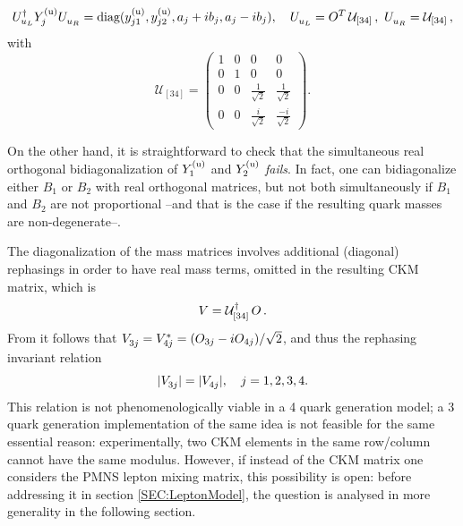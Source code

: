 \documentclass[12pt,a4paper]{article}
\begin{document}
\begin{equation}\label{eq:block2x2:YUdiag:0}
 \ULUd\YU{j}\URU=\text{diag}(\yU{j1},\yU{j2},a_j+ib_j,a_j-ib_j),\quad 
 \ULU=O^T\,\mathcal U_{[34]}\,,\ \URU=\mathcal U_{[34]}\,,
\end{equation}
with 
\begin{equation}
 \mathcal U_{[34]}=\begin{pmatrix}1&0&0&0\\ 0&1&0&0\\ 0&0&\frac{1}{\sqrt 2}& \frac{1}{\sqrt 2}\\ 0&0&\frac{i}{\sqrt 2}&\frac{-i}{\sqrt 2}\end{pmatrix}.
\end{equation}

On the other hand, it is straightforward to check that the simultaneous real orthogonal bidiagonalization of $Y_{1}^{\rm (u)}$ and $Y_{2}^{\rm (u)}$ \emph{fails}. In fact, one can bidiagonalize either $B_1$ or $B_2$ with real orthogonal matrices, but not both simultaneously if $B_1$ and $B_2$ are not proportional --and that is the case if the resulting quark masses are non-degenerate--.

The diagonalization of the mass matrices involves additional (diagonal) rephasings in order to have real mass terms, omitted in the resulting CKM matrix, which is
\begin{equation}\label{eq:exCKM:00}
V =\mathcal U_{[34]}^\dagger\,O\,.
\end{equation}
From  it follows that $\V{3j}=\Vc{4j}=(O_{3j}-iO_{4j})/\sqrt{2}$, and thus the rephasing invariant relation 
\begin{equation}
|\V{3j}|=|\V{4j}|,\quad j=1,2,3,4.
\end{equation}
This relation is not phenomenologically viable in a 4 quark generation model; a 3 quark generation implementation of the same idea is not feasible for the same essential reason: experimentally, two CKM elements in the same row/column cannot have the same modulus. However, if instead of the CKM matrix one considers the PMNS lepton mixing matrix, this possibility is open: before addressing it in section \ref{SEC:LeptonModel}, the question is analysed in more generality in the following section.

\end{document}
